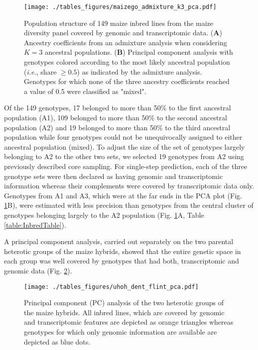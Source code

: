 \documentclass[12pt,titlepage]{article}
\begin{document}
\begin{figure}[H]
\centering
\texttt{[image: ./tables\_figures/maizego\_admixture\_k3\_pca.pdf]}
\caption{
  Population structure of 149 maize inbred lines from the maize diversity panel
  covered by genomic and transcriptomic data.
  (\textbf{A}) Ancestry coefficients from an admixture analysis when 
  considering $K=3$ ancestral populations.
  (\textbf{B}) Principal component analysis with genotypes colored according to 
  the most likely ancestral population (\textit{i.e.}, share $\geq 0.5$) as 
  indicated by the admixture analysis.
  Genotypes for which none of the three ancestry coefficients reached a value
  of 0.5 were classified as "mixed".
}
\label{fig:PopStructure}
\end{figure}


Of the 149 genotypes, 17 belonged to more than 50\% to the first ancestral
population (A1), 109 belonged to more than 50\% to the second ancestral
population (A2) and 19 belonged to more than 50\% to the third ancestral
population while four genotypes could not be unequivocally assigned to either
ancestral population (mixed).
To adjust the size of the set of genotypes largely belonging to A2 to the other
two sets, we selected 19 genotypes from A2 using previously described core
sampling.
For single-step prediction, each of the three genotype sets were then declared
as having genomic and transcriptomic information whereas their complements were
covered by transcriptomic data only.
Genotypes from A1 and A3, which were at the far ends in the PCA plot (Fig.
\ref{fig:PopStructure}B), were estimated with less precision than genotypes
from the central cluster of genotypes belonging largely to the A2 population
(Fig. \ref{fig:PopStructure}A, Table \ref{table:InbredTable}).


A principal component analysis, carried out separately on the two parental
heterotic groups of the maize hybrids, showed that the entire genetic space in
each group was well covered by genotypes that had both, transcriptomic and
genomic data (Fig. \ref{fig:UHOH-PCA}).

\begin{figure}[H]
\centering
\texttt{[image: ./tables\_figures/uhoh\_dent\_flint\_pca.pdf]}
\caption{
  Principal component (PC) analysis of the two heterotic groups of the maize 
  hybrids.
  All inbred lines, which are covered by genomic and transcriptomic features
  are depicted as orange triangles whereas genotypes for which only genomic
  information are available are depicted as blue dots.
}
\label{fig:UHOH-PCA}
\end{figure}
\end{document}
